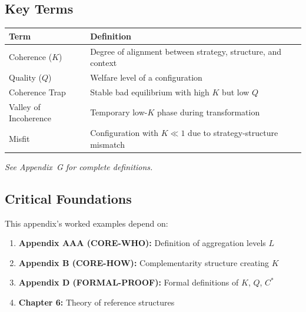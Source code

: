
\subsection{Key Terms}

\begin{tabular}{@{}p{3cm}p{9cm}@{}}
\textbf{Term} & \textbf{Definition} \\
\hline
Coherence ($K$) & Degree of alignment between strategy, structure, and context \\
Quality ($Q$) & Welfare level of a configuration \\
Coherence Trap & Stable bad equilibrium with high $K$ but low $Q$ \\
Valley of Incoherence & Temporary low-$K$ phase during transformation \\
Misfit & Configuration with $K \ll 1$ due to strategy-structure mismatch \\
\end{tabular}

\noindent\textit{See Appendix~G for complete definitions.}


\subsection{Critical Foundations}

\begin{tcolorbox}[colback=red!5!white, colframe=red!75!black,
    title=\textbf{Critical Foundations for Appendix F}]

This appendix's worked examples depend on:

\begin{enumerate}
    \item \textbf{Appendix AAA (CORE-WHO):} Definition of aggregation levels $L$
    \item \textbf{Appendix B (CORE-HOW):} Complementarity structure creating $K$
    \item \textbf{Appendix D (FORMAL-PROOF):} Formal definitions of $K$, $Q$, $C^*$
    \item \textbf{Chapter 6:} Theory of reference structures
\end{enumerate}

\end{tcolorbox}


